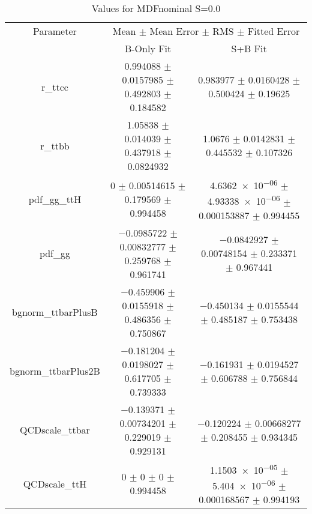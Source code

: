 \begin{table}
\centering
\caption{Values for MDFnominal S=0.0}
\begin{tabular}{ccc}
\toprule
Parameter & \multicolumn{2}{c}{Mean $\pm$ Mean Error $\pm$ RMS $\pm$ Fitted Error}\\
 & B-Only Fit & S+B Fit\\
\midrule
r\_ttcc & \num{0.994088} $\pm$ \num{0.0157985} $\pm$ \num{0.492803} $\pm$ \num{0.184582} & \num{0.983977} $\pm$ \num{0.0160428} $\pm$ \num{0.500424} $\pm$ \num{0.19625}\\
r\_ttbb & \num{1.05838} $\pm$ \num{0.014039} $\pm$ \num{0.437918} $\pm$ \num{0.0824932} & \num{1.0676} $\pm$ \num{0.0142831} $\pm$ \num{0.445532} $\pm$ \num{0.107326}\\
pdf\_gg\_ttH & \num{0} $\pm$ \num{0.00514615} $\pm$ \num{0.179569} $\pm$ \num{0.994458} & \num{4.6362e-06} $\pm$ \num{4.93338e-06} $\pm$ \num{0.000153887} $\pm$ \num{0.994455}\\
pdf\_gg & \num{-0.0985722} $\pm$ \num{0.00832777} $\pm$ \num{0.259768} $\pm$ \num{0.961741} & \num{-0.0842927} $\pm$ \num{0.00748154} $\pm$ \num{0.233371} $\pm$ \num{0.967441}\\
bgnorm\_ttbarPlusB & \num{-0.459906} $\pm$ \num{0.0155918} $\pm$ \num{0.486356} $\pm$ \num{0.750867} & \num{-0.450134} $\pm$ \num{0.0155544} $\pm$ \num{0.485187} $\pm$ \num{0.753438}\\
bgnorm\_ttbarPlus2B & \num{-0.181204} $\pm$ \num{0.0198027} $\pm$ \num{0.617705} $\pm$ \num{0.739333} & \num{-0.161931} $\pm$ \num{0.0194527} $\pm$ \num{0.606788} $\pm$ \num{0.756844}\\
QCDscale\_ttbar & \num{-0.139371} $\pm$ \num{0.00734201} $\pm$ \num{0.229019} $\pm$ \num{0.929131} & \num{-0.120224} $\pm$ \num{0.00668277} $\pm$ \num{0.208455} $\pm$ \num{0.934345}\\
QCDscale\_ttH & \num{0} $\pm$ \num{0} $\pm$ \num{0} $\pm$ \num{0.994458} & \num{1.1503e-05} $\pm$ \num{5.404e-06} $\pm$ \num{0.000168567} $\pm$ \num{0.994193}\\
\bottomrule
\end{tabular}
\end{table}